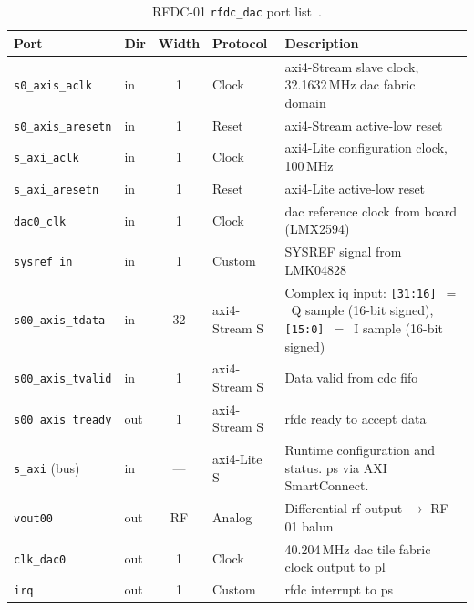 \begin{table}[htbp]
  \caption{RFDC-01 \texttt{rfdc\_dac} port list~\cite{AMD_PG269}.}
  \label{tab:rfdc01_ports}
  \centering
  \small
  \begin{tabular}{llcp{2.6cm}p{6.8cm}}
    \hline
    Port                         & Dir  & Width & Protocol
      & Description \\
    \hline
    \texttt{s0\_axis\_aclk}      & in   & 1     & Clock
      & \ac{axi}4-Stream slave clock, 32.1632\,MHz \ac{dac}
        fabric domain \\[2pt]
    \texttt{s0\_axis\_aresetn}   & in   & 1     & Reset
      & \ac{axi}4-Stream active-low reset \\[2pt]
    \texttt{s\_axi\_aclk}        & in   & 1     & Clock
      & \ac{axi}4-Lite configuration clock, 100\,MHz \\[2pt]
    \texttt{s\_axi\_aresetn}     & in   & 1     & Reset
      & \ac{axi}4-Lite active-low reset \\[2pt]
    \texttt{dac0\_clk}           & in   & 1     & Clock
      & \ac{dac} reference clock from board
        (LMX2594)~\cite{TI_LMX2594} \\[2pt]
    \texttt{sysref\_in}          & in   & 1     & Custom
      & SYSREF signal from LMK04828~\cite{TI_LMK04828} \\[2pt]
    \texttt{s00\_axis\_tdata}    & in   & 32    & \ac{axi}4-Stream S
      & Complex \ac{iq} input: \texttt{[31:16]}~$=$~Q sample
        (16-bit signed), \texttt{[15:0]}~$=$~I sample
        (16-bit signed) \\[2pt]
    \texttt{s00\_axis\_tvalid}   & in   & 1     & \ac{axi}4-Stream S
      & Data valid from \ac{cdc} \ac{fifo} \\[2pt]
    \texttt{s00\_axis\_tready}   & out  & 1     & \ac{axi}4-Stream S
      & \ac{rfdc} ready to accept data \\[2pt]
    \texttt{s\_axi} (bus)        & in   & —     & \ac{axi}4-Lite S
      & Runtime configuration and status.
        \ac{ps} via AXI SmartConnect. \\[2pt]
    \texttt{vout00}              & out  & RF    & Analog
      & Differential \ac{rf} output $\to$ RF-01
        balun~\cite{RealDigital_A6} \\[2pt]
    \texttt{clk\_dac0}           & out  & 1     & Clock
      & 40.204\,MHz \ac{dac} tile fabric clock output
        to \ac{pl} \\[2pt]
    \texttt{irq}                 & out  & 1     & Custom
      & \ac{rfdc} interrupt to \ac{ps} \\
    \hline
  \end{tabular}
\end{table}

